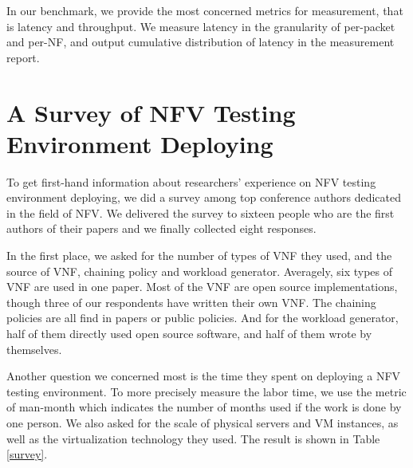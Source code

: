 \documentclass{sig-alternate-10pt}
\begin{document}
In our benchmark, we provide the most concerned metrics for measurement, 
that is latency and throughput. 
We measure latency in the granularity of per-packet and per-NF, 
and output cumulative distribution of latency in the measurement report. 


%
%

\section{A Survey of NFV Testing Environment Deploying}
To get first-hand information about researchers' experience on 
NFV testing environment deploying, 
we did a survey among top conference authors 
dedicated in the field of NFV. 
We delivered the survey to sixteen people 
who are the first authors of their papers %
and we finally collected eight responses. 

In the first place, we asked for the number of types of VNF they used, 
and the source of VNF, chaining policy and workload generator. 
Averagely, six types of VNF are used in one paper. 
Most of the VNF are open source implementations, 
though three of our respondents have written their own VNF. 
The chaining policies are all find in papers or public policies. 
And for the workload generator, 
half of them directly used open source software, 
and half of them wrote by themselves.

Another question we concerned most is 
the time they spent on deploying a NFV testing environment. 
To more precisely measure the labor time, 
we use the metric of man-month 
which indicates the number of months used 
if the work is done by one person. 
We also asked for the scale of physical servers and VM instances, 
as well as the virtualization technology they used. 
The result is shown in Table \ref{survey}.
\end{document}
